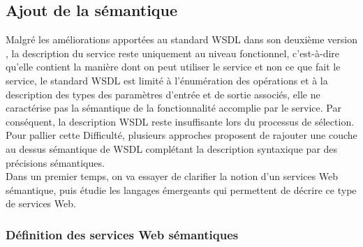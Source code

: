   \subsection{Ajout de la sémantique}
  Malgré les améliorations apportées au standard \textsc{WSDL} dans
  son deuxième version \cite{chinnici2007web}, la description du
  service reste uniquement au niveau fonctionnel, c'est-à-dire qu'elle
  contient la manière dont on peut utiliser le service et non ce que
  fait le service, le standard \textsc{WSDL} est limité à
  l'énumération des opérations et à la description des types des
  paramètres d'entrée et de sortie associés, elle ne caractérise pas
  la sémantique de la fonctionnalité accomplie par le service. Par
  conséquent, la description \textsc{WSDL} reste insuffisante lors du
  processus de sélection.  Pour pallier cette Difficulté, plusieurs
  approches proposent de rajouter une couche au dessus sémantique de
  \textsc{WSDL} complétant la description syntaxique par
  des précisions sémantiques.\\

  Dans un premier temps, on va essayer de clarifier la notion d'un
  services Web sémantique, puis étudie les langages émergeants qui
  permettent de décrire ce type de services Web.

    \subsubsection{Définition des services Web sémantiques}



